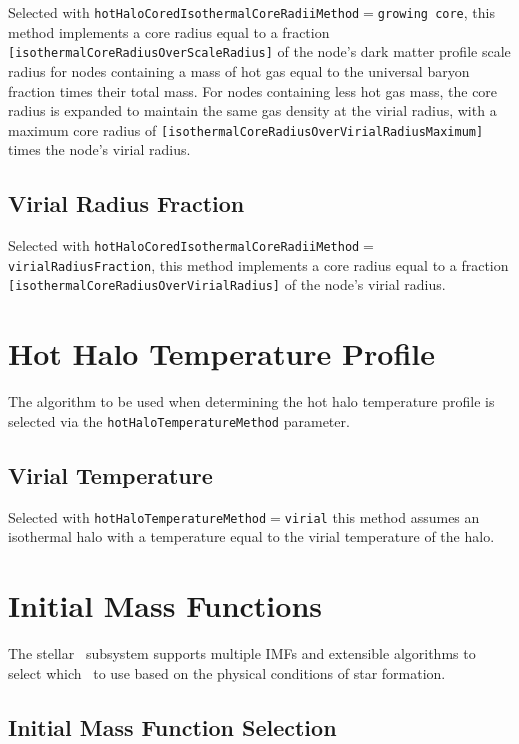 Selected with {\tt hotHaloCoredIsothermalCoreRadiiMethod}$=${\tt growing core}, this method implements a core radius equal to a fraction {\tt [isothermalCoreRadiusOverScaleRadius]} of the node's dark matter profile scale radius for nodes containing a mass of hot gas equal to the universal baryon fraction times their total mass. For nodes containing less hot gas mass, the core radius is expanded to maintain the same gas density at the virial radius, with a maximum core radius of {\tt [isothermalCoreRadiusOverVirialRadiusMaximum]} times the node's virial radius.

\subsection{Virial Radius Fraction}

Selected with {\tt hotHaloCoredIsothermalCoreRadiiMethod}$=${\tt virialRadiusFraction}, this method implements a core radius equal to a fraction {\tt [isothermalCoreRadiusOverVirialRadius]} of the node's virial radius.

\section{Hot Halo Temperature Profile}\label{sec:HotHaloTemperature}

The algorithm to be used when determining the hot halo temperature profile is selected via the {\tt hotHaloTemperatureMethod} parameter.

\subsection{Virial Temperature}

Selected with {\tt hotHaloTemperatureMethod}$=${\tt virial} this method assumes an isothermal halo with a temperature equal to the virial temperature of the halo.

\section{Initial Mass Functions}

The stellar \IMF\ subsystem supports multiple IMFs and extensible algorithms to select which \IMF\ to use based on the physical conditions of star formation.

\subsection{Initial Mass Function Selection}


